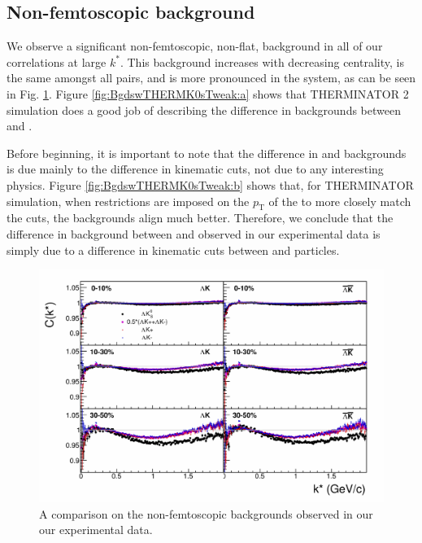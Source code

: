 \documentclass[/home/jesse/Analysis/FemtoAnalysis/AnalysisNotes/AnalysisNoteJBuxton.tex]{subfiles}
\begin{document}
\subsection{Non-femtoscopic background}
\label{NonFlatBackground}

We observe a significant non-femtoscopic, non-flat, background in all of our correlations at large $k^{*}$.  
This background increases with decreasing centrality, is the same amongst all \LamKpm pairs, and is more pronounced in the \LamKs system, as can be seen in Fig. \ref{fig:CompareAllBgds}.  
Figure \ref{fig:BgdswTHERMK0sTweak:a} shows that THERMINATOR 2 simulation does a good job of describing the difference in backgrounds between \LamKpm and \LamKs.

Before beginning, it is important to note that the difference in \LamKpm and \LamKs backgrounds is due mainly to the difference in kinematic cuts, not due to any interesting physics.  
Figure \ref{fig:BgdswTHERMK0sTweak:b} shows that, for THERMINATOR simulation, when restrictions are imposed on the $p_{\textrm{T}}$ of the \Ks to more closely match the \Kpm cuts, the backgrounds align much better.  
Therefore, we conclude that the difference in background between \LamKpm and \LamKs observed in our experimental data is simply due to a difference in kinematic cuts between \Kpm and \Ks particles.

\begin{figure}[h]
  \centering
  \includegraphics[width=\textwidth]{5_Fitting/Figures/CompareLamKchAvgToLamK0_wIndivKch_0010_1030_3050.pdf}
  \caption[Compare Non-Femtoscopic Backgrounds]{A comparison on the non-femtoscopic backgrounds observed in our our \LamK experimental data.}
  \label{fig:CompareAllBgds}
\end{figure}
\end{document}
